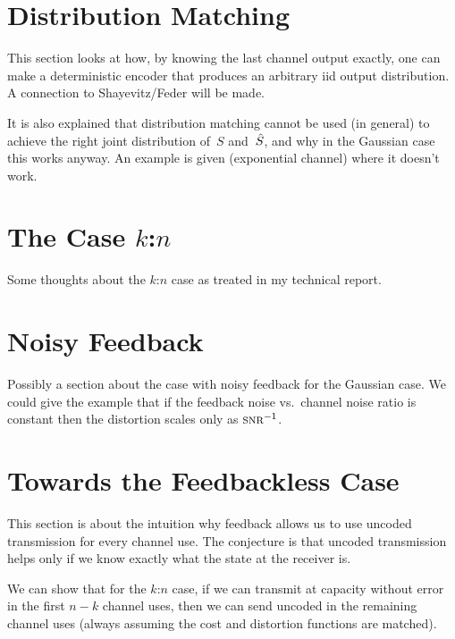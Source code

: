 \section{Distribution Matching}

This section looks at how, by knowing the last channel output exactly, one can
make a deterministic encoder that produces an arbitrary iid output distribution.
A connection to Shayevitz/Feder will be made. 

It is also explained that distribution matching cannot be used (in general) to
achieve the right joint distribution of~$S$ and~${\hat{S}}$, and why in the Gaussian
case this works anyway. An example is given (exponential channel) where it
doesn't work. 


\section{The Case $k$:$n$}

Some thoughts about the $k$:$n$ case as treated in my technical report.


\section{Noisy Feedback}

Possibly a section about the case with noisy feedback for the Gaussian case. We
could give the example that if the feedback noise vs.\ channel noise ratio is
constant then the distortion scales only as $\snr^{-1}$.

\section{Towards the Feedbackless Case}

This section is about the intuition why feedback allows us to use uncoded
transmission for every channel use. The conjecture is that uncoded transmission
helps only if we know exactly what the state at the receiver is. 

We can show that for the $k$:$n$ case, if we can transmit at capacity without
error in the first $n-k$ channel uses, then we can send uncoded in the remaining
channel uses (always assuming the cost and distortion functions are matched).
